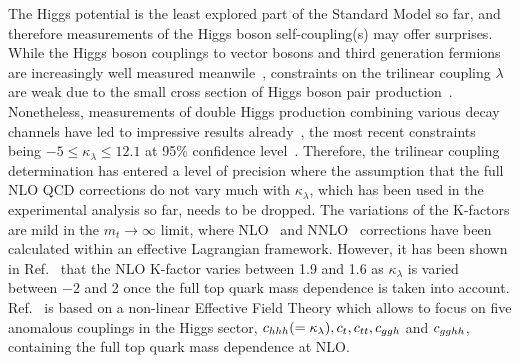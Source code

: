 The Higgs potential is the least explored part of the Standard Model so far, and therefore measurements of the Higgs boson self-coupling(s) may offer surprises.
While the Higgs boson couplings to vector bosons and third generation fermions are increasingly well measured meanwile~\cite{Khachatryan:2016vau,ATLAS:2018doi,CMS-PAS-HIG-17-031}, constraints on the trilinear coupling $\lambda$ are weak due to the small cross section of Higgs boson pair production~\cite{Glover:1987nx,Dawson:1998py,Baglio:2012np,Frederix:2014hta}.
Nonetheless, measurements of double Higgs production combining various decay channels have led to impressive results already~\cite{CMS-PAS-HIG-17-030,ATLAS-CONF-2018-043}, 
the most recent constraints being $-5\leq \kappa_\lambda\leq 12.1$
 at 95\% confidence level~\cite{ATLAS-CONF-2018-043}.
Therefore, the trilinear coupling determination has entered a level of precision where the assumption that the full NLO QCD corrections do not vary much with $\kappa_\lambda$, which has been used in the experimental analysis so far, needs to be dropped.
The variations of the K-factors are mild in the $m_t\to \infty$ limit, where NLO~\cite{Grober:2015cwa,Grober:2017gut} and NNLO~\cite{deFlorian:2017qfk} corrections have been calculated within an effective Lagrangian framework.
However, it has been shown in Ref.~\cite{Buchalla:2018yce} that the NLO K-factor varies between 1.9 and 1.6 as $\kappa_\lambda$ is varied between $-2$ and 2 once the full top quark mass dependence is taken into account. 
Ref.~\cite{Buchalla:2018yce} is based on a non-linear Effective Field Theory which allows to focus on five anomalous couplings in the Higgs sector, $c_{hhh}(=\kappa_\lambda), c_{t},c_{tt},c_{ggh}$ and $c_{gghh}$, containing the full top quark mass dependence at NLO.


